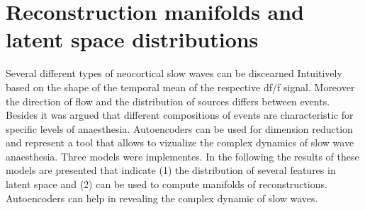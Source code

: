 \section{Reconstruction manifolds and latent space distributions}
Several different types of neocortical slow waves can be discearned Intuitively based on the shape of the temporal mean of the respective df/f signal. Moreover the direction of flow and the distribution of sources differs between events. Besides it was argued that different compositions of events are characteristic for specific levels of anaesthesia. Autoencoders can be used for dimension reduction and represent a tool that allows to vizualize the complex dynamics of slow wave anaesthesia. Three models were implementes. In the following the results of these models are presented that indicate (1) the distribution of several features in latent space and (2) can be used to compute manifolds of reconstructions. Autoencoders can help in revealing the complex dynamic of slow waves.\\
